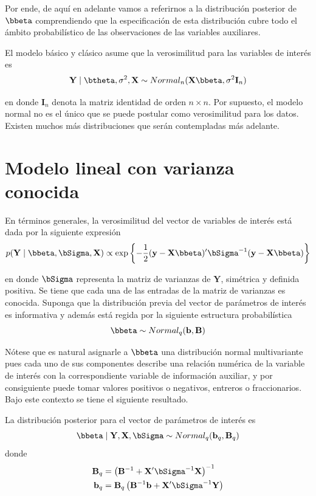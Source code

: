 Por ende, de aquí en adelante vamos a referirnos a la distribución posterior de $\bbeta$ comprendiendo que la especificación de esta distribución cubre todo el ámbito probabilístico de las observaciones de las variables auxiliares.

El modelo básico y clásico asume que la verosimilitud para las variables de interés es
\begin{equation*}
\mathbf{Y} \mid \btheta,\sigma^2,\mathbf{X}\sim Normal_n(\mathbf{X}\bbeta,\sigma^2\mathbf{I}_n)
\end{equation*}

en donde $\mathbf{I}_n$ denota la matriz identidad de orden $n\times n$. Por supuesto, el modelo normal no es el único que se puede postular como verosimilitud para los datos. Existen muchos más distribuciones que serán contempladas más adelante.

\section{Modelo lineal con varianza conocida}

En términos generales, la verosimilitud del vector de variables de interés está dada por la siguiente expresión
\begin{equation}
p(\mathbf{Y} \mid \bbeta,\bSigma,\mathbf{X})\propto \exp\left\{-\frac{1}{2}(\mathbf{y}-\mathbf{X}\bbeta)'\bSigma^{-1}(\mathbf{y}-\mathbf{X}\bbeta)\right\}
\end{equation}

en donde $\bSigma$ representa la matriz de varianzas de $\mathbf{Y}$, simétrica y definida positiva. Se tiene que cada una de las entradas de la matriz de varianzas  es conocida. Suponga que la distribución previa del vector de parámetros de interés es informativa y además está regida por la siguiente estructura probabilística
\begin{equation*}
\bbeta\sim Normal_q(\mathbf{b},\mathbf{B})
\end{equation*}

Nótese que es natural asignarle a $\bbeta$ una distribución normal multivariante pues cada uno de sus componentes describe una relación numérica de la variable de interés con la correspondiente variable de información auxiliar, y por consiguiente puede tomar valores positivos o negativos, entreros o fraccionarios. Bajo este contexto se tiene el siguiente resultado.

\begin{Res}
La distribución posterior para el vector de parámetros de interés es
\begin{equation*}
\bbeta \mid \mathbf{Y},\mathbf{X},\bSigma \sim Normal_q(\mathbf{b}_q,\mathbf{B}_q)
\end{equation*}
donde
\begin{align*}
\mathbf{B}_q &= \left(\mathbf{B}^{-1}+\mathbf{X}'\bSigma^{-1}\mathbf{X}\right)^{-1}\\
\mathbf{b}_q &=\mathbf{B}_q\left(\mathbf{B}^{-1}\mathbf{b}+\mathbf{X}'\bSigma^{-1}\mathbf{Y}\right)
\end{align*}
\end{Res}


